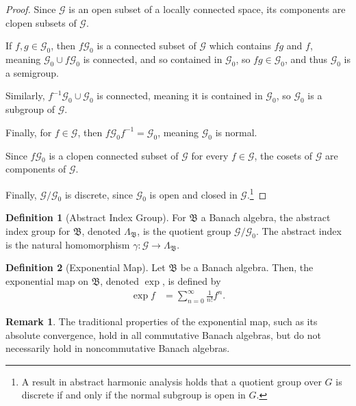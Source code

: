 \documentclass[10pt]{extarticle}
\theoremstyle{plain}
\theoremstyle{definition}
\newtheorem*{definition}{Definition}
\theoremstyle{note}
\newtheorem*{remark}{Remark}
\renewcommand{\newline}{\hfill\break}
\begin{document}
\begin{proof}
  Since $\mathcal{G}$ is an open subset of a locally connected space, its components are clopen subsets of $\mathcal{G}$.\newline

  If $f,g\in \mathcal{G}_0$, then $f\mathcal{G}_0$ is a connected subset of $\mathcal{G}$ which contains $fg$ and $f$, meaning $\mathcal{G}_0 \cup f\mathcal{G}_0$ is connected, and so contained in $\mathcal{G}_0$, so $fg\in \mathcal{G}_0$, and thus $\mathcal{G}_0$ is a semigroup.\newline

  Similarly, $f^{-1}\mathcal{G}_0\cup \mathcal{G}_0$ is connected, meaning it is contained in $\mathcal{G}_0$, so $\mathcal{G}_0$ is a subgroup of $\mathcal{G}$.\newline

  Finally, for $f\in \mathcal{G}$, then $f\mathcal{G}_0 f^{-1} = \mathcal{G}_0$, meaning $\mathcal{G}_0$ is normal.\newline

  Since $f\mathcal{G}_0$ is a clopen connected subset of $\mathcal{G}$ for every $f\in \mathcal{G}$, the cosets of $\mathcal{G}$ are components of $\mathcal{G}$.\newline

  Finally, $\mathcal{G}/\mathcal{G}_0$ is discrete, since $\mathcal{G}_0$ is open and closed in $\mathcal{G}$.\footnote{A result in abstract harmonic analysis holds that a quotient group over $G$ is discrete if and only if the normal subgroup is open in $G$.}
\end{proof}
\begin{definition}[Abstract Index Group]
  For $\mathfrak{B}$ a Banach algebra, the abstract index group for $\mathfrak{B}$, denoted $\Lambda_{\mathfrak{B}}$, is the quotient group $\mathcal{G}/\mathcal{G}_0$. The abstract index is the natural homomorphism $\gamma: \mathcal{G}\rightarrow \Lambda_{\mathfrak{B}}$.
\end{definition}
\begin{definition}[Exponential Map]
  Let $\mathfrak{B}$ be a Banach algebra. Then, the exponential map on $\mathfrak{B}$, denoted $\exp$, is defined by
  \begin{align*}
    \exp f &= \sum_{n=0}^{\infty}\frac{1}{n!}f^n.
  \end{align*}
\end{definition}
\begin{remark}
  The traditional properties of the exponential map, such as its absolute convergence, hold in all commutative Banach algebras, but do not necessarily hold in noncommutative Banach algebras.
\end{remark}
\end{document}
